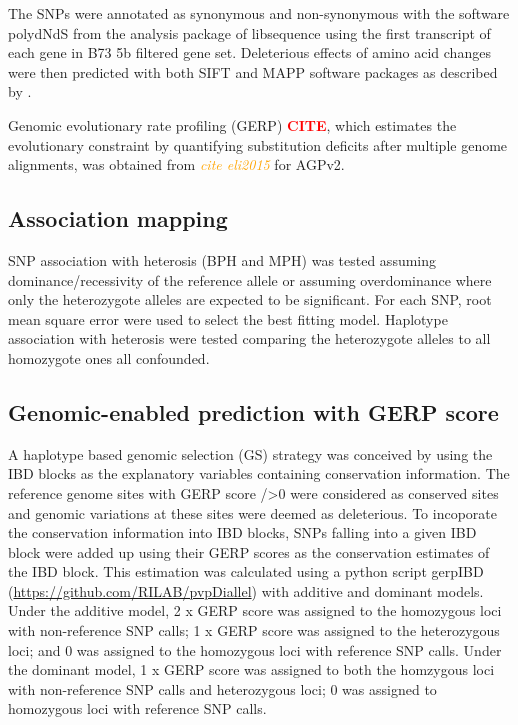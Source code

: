 \documentclass[9pt,twocolumn,twoside]{gsajnl}
\newcommand{\sme}[1]{\textcolor{red}{\bf #1}}
\newcommand{\yang}[1]{\textcolor{orange}{\emph{\scriptsize  #1}} }
\begin{document}
The SNPs were annotated as synonymous and non-synonymous with the software polydNdS from the analysis package of libsequence  \citep{Thornton2003} using the first transcript of each gene in B73 5b filtered gene set. Deleterious effects of amino acid changes were then predicted with both SIFT \citep{Ng2003, Ng2006} and MAPP \citep{Stone2005} software packages as described by \citep{Mezmouk2014}.

Genomic evolutionary rate profiling (GERP) \sme{CITE}, which estimates the evolutionary constraint by quantifying substitution deficits after multiple genome alignments, was obtained from \yang{cite eli2015} for AGPv2. 

\subsection*{Association mapping}
SNP association with heterosis (BPH and MPH) was tested assuming dominance/recessivity of the reference allele or assuming overdominance where only the heterozygote alleles are expected to be significant. For each SNP, root mean square error were used to select the best fitting model. 
Haplotype association with heterosis were tested comparing the heterozygote alleles to all homozygote ones all confounded. 


\subsection*{Genomic-enabled prediction with GERP score}

A haplotype based genomic selection (GS) strategy was conceived by using the IBD blocks as the explanatory variables containing conservation information. The reference genome sites with GERP score />0 were considered as conserved sites and genomic variations at these sites were deemed as deleterious. To incoporate the conservation information into IBD blocks, SNPs falling into a given IBD block were added up using their GERP scores as the conservation estimates of the IBD block. This estimation was calculated using a python script gerpIBD (\url{https://github.com/RILAB/pvpDiallel}) with additive and dominant models. Under the additive model, 2 x GERP score was assigned to the homozygous loci with non-reference SNP calls; 1 x GERP score was assigned to the heterozygous loci; and 0 was assigned to the homozygous loci with reference SNP calls. Under the dominant model, 1 x GERP score was assigned to both the homzygous loci with non-reference SNP calls and heterozygous loci; 0 was assigned to homozygous loci with reference SNP calls.
\end{document}
